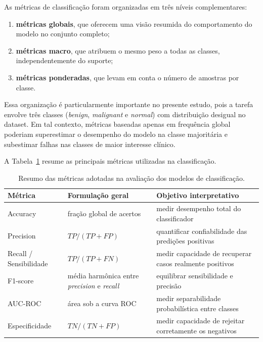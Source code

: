 \documentclass[tcc,capa]{texufpel}
\begin{document}
As métricas de classificação foram organizadas em três níveis complementares:
\begin{enumerate}
	\item \textbf{métricas globais}, que oferecem uma visão resumida do comportamento do modelo no conjunto completo;
	\item \textbf{métricas macro}, que atribuem o mesmo peso a todas as classes, independentemente do suporte;
	\item \textbf{métricas ponderadas}, que levam em conta o número de amostras por classe.
\end{enumerate}

Essa organização é particularmente importante no presente estudo, pois a tarefa envolve três classes (\textit{benign}, \textit{malignant} e \textit{normal}) com distribuição desigual no dataset. Em tal contexto, métricas baseadas apenas em frequência global poderiam superestimar o desempenho do modelo na classe majoritária e subestimar falhas nas classes de maior interesse clínico.

A Tabela~\ref{tab:classification_metrics_summary} resume as principais métricas utilizadas na classificação.

\begin{table}[htbp]
	\centering
	\caption{Resumo das métricas adotadas na avaliação dos modelos de classificação.}
	\label{tab:classification_metrics_summary}
	\begin{tabular}{p{3.4cm} p{4.6cm} p{6.2cm}}
		\hline
		\textbf{Métrica} & \textbf{Formulação geral} & \textbf{Objetivo interpretativo} \\[0.2cm]
		\hline
		Accuracy & fração global de acertos & medir desempenho total do classificador \\
		Precision & \(TP/(TP+FP)\) & quantificar confiabilidade das predições positivas \\
		Recall / Sensibilidade & \(TP/(TP+FN)\) & medir capacidade de recuperar casos realmente positivos \\
		F1-score & média harmônica entre \textit{precision} e \textit{recall} & equilibrar sensibilidade e precisão \\
		AUC-ROC & área sob a curva ROC & medir separabilidade probabilística entre classes \\
		Especificidade & \(TN/(TN+FP)\) & medir capacidade de rejeitar corretamente os negativos \\
		\hline
	\end{tabular}
\end{table}
\end{document}
